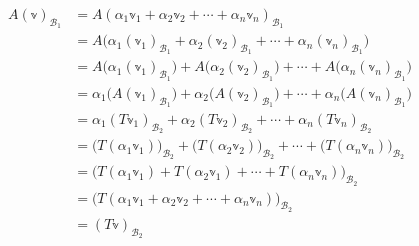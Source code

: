 \begin{align*}
    A(\mathbb{v})_{\mathcal{B}_1} & = A(\alpha_1\mathbb{v}_1 + \alpha_2\mathbb{v}_2 + \cdots + \alpha_n\mathbb{v}_n)_{\mathcal{B}_1} \\
    & = A \big( \alpha_1(\mathbb{v}_1)_{\mathcal{B}_1} + \alpha_2(\mathbb{v}_2)_{\mathcal{B}_1} + \cdots + \alpha_n(\mathbb{v}_n)_{\mathcal{B}_1} \big) \\
    & = A \big( \alpha_1(\mathbb{v}_1)_{\mathcal{B}_1} \big) + A \big( \alpha_2(\mathbb{v}_2)_{\mathcal{B}_1} \big) + \cdots + A \big( \alpha_n(\mathbb{v}_n)_{\mathcal{B}_1} \big) \\
    & = \alpha_1 \big( A(\mathbb{v}_1)_{\mathcal{B}_1} \big) + \alpha_2 \big( A(\mathbb{v}_2)_{\mathcal{B}_1} \big) + \cdots + \alpha_n \big( A(\mathbb{v}_n)_{\mathcal{B}_1} \big) \\
    & = \alpha_1 (T\mathbb{v}_1)_{\mathcal{B}_2} + \alpha_2 (T\mathbb{v}_2)_{\mathcal{B}_2} + \cdots + \alpha_n (T\mathbb{v}_n)_{\mathcal{B}_2} \\
    & = \big( T(\alpha_1\mathbb{v}_1) \big)_{\mathcal{B}_2} + \big( T(\alpha_2\mathbb{v}_2) \big)_{\mathcal{B}_2} + \cdots + \big( T(\alpha_n\mathbb{v}_n) \big)_{\mathcal{B}_2} \\
    & = \big( T(\alpha_1\mathbb{v}_1) + T(\alpha_2\mathbb{v}_1) + \cdots + T(\alpha_n\mathbb{v}_n) \big)_{\mathcal{B}_2} \\
    & = \big( T(\alpha_1\mathbb{v}_1 + \alpha_2\mathbb{v}_2 + \cdots + \alpha_n\mathbb{v}_n) \big)_{\mathcal{B}_2} \\
    & = (T\mathbb{v})_{\mathcal{B}_2}
\end{align*}

